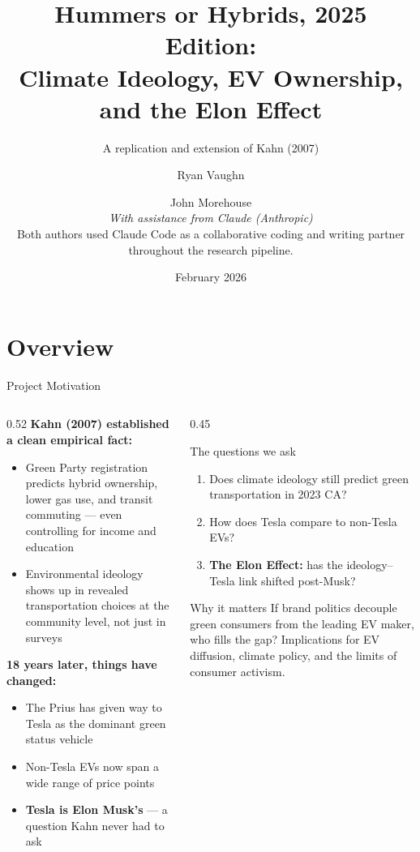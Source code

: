 \documentclass[aspectratio=169,t]{beamer}
\title[Hummers or Hybrids, 2025 Edition]{%
  Hummers or Hybrids, 2025 Edition:\\[0.3em]
  Climate Ideology, EV Ownership, and the Elon Effect}
\subtitle{A replication and extension of Kahn (2007)}
\author[Vaughn \& Morehouse]{%
  Ryan Vaughn \and John Morehouse\\[0.5em]
  {\small\textit{With assistance from Claude (Anthropic)}}\\
  {\footnotesize Both authors used Claude Code as a collaborative coding and
  writing partner throughout the research pipeline.}}
\date{February 2026}
\institute{\href{https://github.com/rkvaughn/hummers-or-hybrids}%
  {\texttt{github.com/rkvaughn/hummers-or-hybrids}}}
\begin{document}

\begin{frame}
  \titlepage
\end{frame}

\section{Overview}

\begin{frame}{Project Motivation}
  \begin{columns}[T]
    \begin{column}{0.52\textwidth}
      \small
      \textbf{Kahn (2007) established a clean empirical fact:}
      \begin{itemize}
        \item Green Party registration predicts hybrid ownership, lower gas use,
              and transit commuting --- even controlling for income and education
        \item Environmental ideology shows up in revealed transportation choices
              at the community level, not just in surveys
      \end{itemize}
      \textbf{18 years later, things have changed:}
      \begin{itemize}
        \item The Prius has given way to Tesla as the dominant green status vehicle
        \item Non-Tesla EVs now span a wide range of price points
        \item \textbf{Tesla is Elon Musk's} --- a question Kahn never had to ask
      \end{itemize}
    \end{column}
    \begin{column}{0.45\textwidth}
      \begin{block}{The questions we ask}
        \begin{enumerate}\small
          \item Does climate ideology still predict green transportation in 2023 CA?
          \item How does Tesla compare to non-Tesla EVs?
          \item \textbf{The Elon Effect:} has the ideology--Tesla link shifted post-Musk?
        \end{enumerate}
      \end{block}
      \begin{block}{Why it matters}
        \small If brand politics decouple green consumers from the leading EV
        maker, who fills the gap? Implications for EV diffusion, climate policy,
        and the limits of consumer activism.
      \end{block}
    \end{column}
  \end{columns}
\end{frame}
\end{document}
